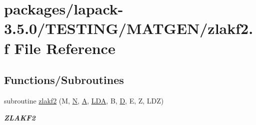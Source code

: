\hypertarget{zlakf2_8f}{}\section{packages/lapack-\/3.5.0/\+T\+E\+S\+T\+I\+N\+G/\+M\+A\+T\+G\+E\+N/zlakf2.f File Reference}
\label{zlakf2_8f}
\subsection*{Functions/\+Subroutines}
\begin{DoxyCompactItemize}
\item 
subroutine \hyperlink{group__complex16__matgen_ga7fb408e40d1f849afc88d6defd28d1f3}{zlakf2} (M, \hyperlink{polmisc_8c_a0240ac851181b84ac374872dc5434ee4}{N}, \hyperlink{classA}{A}, \hyperlink{example__user_8c_ae946da542ce0db94dced19b2ecefd1aa}{L\+D\+A}, B, \hyperlink{odrpack_8h_a7dae6ea403d00f3687f24a874e67d139}{D}, E, Z, L\+D\+Z)
\begin{DoxyCompactList}\small\item\em {\bfseries Z\+L\+A\+K\+F2} \end{DoxyCompactList}\end{DoxyCompactItemize}
